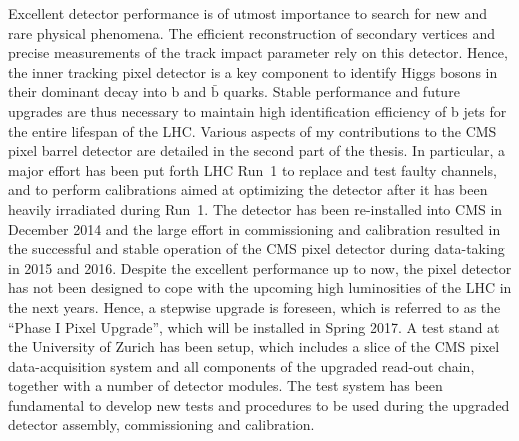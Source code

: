 \noindent Excellent detector performance is of utmost importance to search for new and rare physical phenomena.
The efficient reconstruction of secondary vertices and precise measurements of the track impact parameter rely on this detector.
Hence, the inner tracking pixel detector is a key component to identify Higgs bosons in their dominant decay into b and $\bar{\mathrm{b}}$ quarks.
Stable performance and future upgrades are thus necessary to maintain high identification efficiency of b jets for the entire lifespan of the LHC.
Various aspects of my contributions to the CMS pixel barrel detector are detailed in the second part of the thesis.
In particular, a major effort has been put forth LHC Run~1 to replace and test faulty channels,
and to perform calibrations aimed at optimizing the detector after it has been heavily irradiated during Run~1.
The detector has been re-installed into CMS in December 2014 and the large effort in commissioning and calibration 
resulted in the successful and stable operation of the CMS pixel detector during data-taking in 2015 and 2016.
Despite the excellent performance up to now, the pixel detector has not been designed to cope with the upcoming high luminosities of the LHC in the next years.
Hence, a stepwise upgrade is foreseen, which is referred to as the ``Phase I Pixel Upgrade'', which will be installed in Spring 2017.
A test stand at the University of Zurich has been setup, which includes a slice of the CMS pixel data-acquisition system and all components of the upgraded read-out chain, together with a number of detector modules.
The test system has been fundamental to develop new tests and procedures to be used during the upgraded detector assembly, commissioning and calibration.

\vspace*{\fill}
